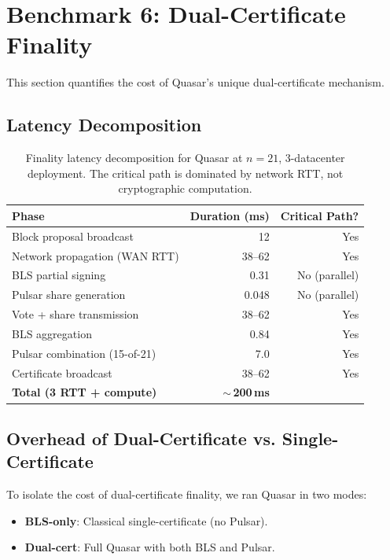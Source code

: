 \section{Benchmark 6: Dual-Certificate Finality}

\label{sec:dual-cert}

This section quantifies the cost of Quasar's unique dual-certificate mechanism.

\subsection{Latency Decomposition}

\begin{table}[h]
\centering
\begin{tabular}{@{}lrr@{}}
\toprule
\textbf{Phase} & \textbf{Duration (ms)} & \textbf{Critical Path?} \\
\midrule
Block proposal broadcast       & 12       & Yes \\
Network propagation (WAN RTT)  & 38--62   & Yes \\
BLS partial signing            & 0.31     & No (parallel) \\
Pulsar share generation      & 0.048    & No (parallel) \\
Vote + share transmission      & 38--62   & Yes \\
BLS aggregation                & 0.84     & Yes \\
Pulsar combination (15-of-21)& 7.0      & Yes \\
Certificate broadcast          & 38--62   & Yes \\
\midrule
\textbf{Total (3 RTT + compute)} & \textbf{$\sim$\,200\,ms} & \\
\bottomrule
\end{tabular}
\caption{Finality latency decomposition for Quasar at $n=21$, 3-datacenter deployment.
The critical path is dominated by network RTT, not cryptographic computation.}
\label{tab:dual-cert-breakdown}
\end{table}

\subsection{Overhead of Dual-Certificate vs. Single-Certificate}

To isolate the cost of dual-certificate finality, we ran Quasar in two modes:
\begin{itemize}
\item \textbf{BLS-only}: Classical single-certificate (no Pulsar).
\item \textbf{Dual-cert}: Full Quasar with both BLS and Pulsar.
\end{itemize}

